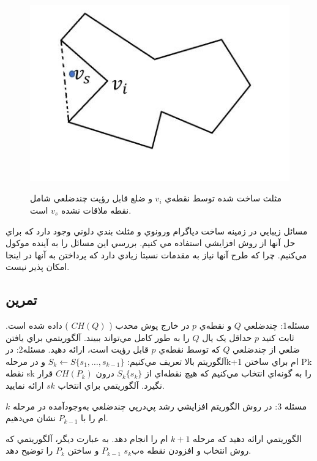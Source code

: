 \documentclass{book}
\begin{document}
\begin{figure}[h!]
    \begin{center}
        \includegraphics[width=\linewidth]{simp_sec3.jpg}
        \label{simp_sec3}
        \caption{مثلث ساخت شده توسط نقطه‌ي $v_i$  و ضلع قابل رؤيت چندضلعي شامل نقطه ملاقات نشده $v_s$ است.}
    \end{center}
\end{figure}

مسائل زيبايي در زمينه ساخت دياگرام ورونوي و مثلث بندي دلوني وجود دارد که براي حل آنها از روش افزايشي استفاده مي کنيم. بررسي اين مسائل را به آينده موکول مي‌کنيم. چرا که طرح آنها نياز به مقدمات نسبتا زيادي دارد که پرداختن به آنها در اينجا امکان پذير نيست.

\subsection{تمرين}

مسئله1: چندضلعي $Q$ و نقطه‌ي $p$ در خارج پوش محدب ( $CH(Q)$ ) داده شده است. ثابت کنيد $p$ حداقل يک يال $Q$ را به‌ طور کامل مي‌تواند ببيند. آلگوريتمي براي يافتن ضلعي از چندضلعي $Q$ که توسط نقطه‌ي $p$ قابل رؤيت است، ارائه دهيد.
مسئله2: در آلگوريتم بالا تعريف مي‌کنيم:  $S_k\leftarrow S\{s_1,…, s_{k-1}\}$ و در مرحلهk+1  ام براي ساختن Pk نقطه sk را به گونه‌اي انتخاب مي‌کنيم که هيچ نقطه‌اي از $S_k\{s_k\}$ درون $CH(P_k)$ قرار ‌نگيرد.  آلگوريتمي براي انتخاب $sk$  ارائه نماييد. 

مسئله 3: در روش الگوريتم افزايشي رشد پي‌در‌پي  چندضلعي به‌وجودآمده در مرحله $k$ ام را با $P_{k-1}$  نشان مي‌دهيم.

 الگوريتمي ارائه دهيد که مرحله $k+1$  ام را انجام دهد. به عبارت ديگر، آلگوريتمي که روش انتخاب و افزودن نقطه  $s_kبه$ $P_{k-1}$ و ساختن  $P_k$ را توضيح دهد.
\end{document}
